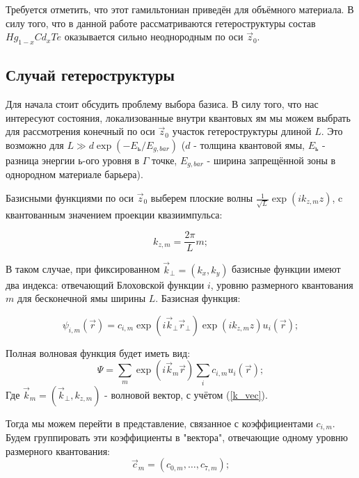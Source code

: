 \documentclass[../main.tex]{subfiles}
\begin{document}
    Требуется отметить, что этот гамильтониан приведён для объёмного материала.
    В силу того, что в данной работе рассматриваются гетероструктуры состав 
    $Hg_{1-x}Cd_{x}Te$ оказывается сильно неоднородным по оси $\vec{z}_0$.

    \subsection{Случай гетероструктуры}

    Для начала стоит обсудить проблему выбора базиса. В силу того, что нас 
    интересуют состояния, локализованные внутри квантовых ям мы можем выбрать
    для рассмотрения конечный по оси $\vec{z}_0$ участок гетероструктуры длиной
    $L$. Это возможно для $L \gg d \exp(- E_ь / E_{g, bar})$ ($d$ - толщина квантовой
    ямы, $E_ь$ - разница энергии $ь$-ого уровня в $\Gamma$ точке, $E_{g,bar}$ - 
    ширина запрещённой зоны в однородном материале барьера).

    Базисными функциями по оси $\vec{z}_0$ выберем плоские волны 
    $\frac{1}{\sqrt L} \exp(i k_{z,m} z)$, c квантованным значением проекции 
    квазиимпульса: 
    
    \begin{equation}
        \label{k_vec}
        k_{z,m} = \frac{2\pi}{L} m;
    \end{equation}

    В таком случае, при фиксированном $\vec{k}_\perp = (k_x,k_y)$ базисные 
    функции имеют два индекса: отвечающий Блоховской функции $i$, уровню размерного
    квантования $m$ для бесконечной ямы ширины $L$. Базисная функция:

    \begin{equation}
        \psi_{i,m}(\vec r) = c_{i, m} \exp(i \vec{k}_\perp \vec{r}_\perp) \exp(i k_{z,m} z) u_i(\vec r);
    \end{equation}

    Полная волновая функция будет иметь вид:
    \begin{equation}
        \label{calculation:wf}
        \Psi = \sum_m \exp(i \vec{k}_{m} \vec r) \sum_{i}  c_{i,m} u_i(\vec r);
    \end{equation}
    Где $\vec{k}_m = (\vec{k}_\perp,k_{z,m})$ - волновой вектор, с учётом (\ref{k_vec}). 

    Тогда мы можем перейти в представление, связанное с коэффициентами $c_{i,m}$. 
    Будем группировать эти коэффициенты в "вектора", отвечающие одному уровню 
    размерного квантования:
    \begin{equation*}
        \vec{c}_m = (c_{0, m},\hdots,c_{7, m});
    \end{equation*}
\end{document}
